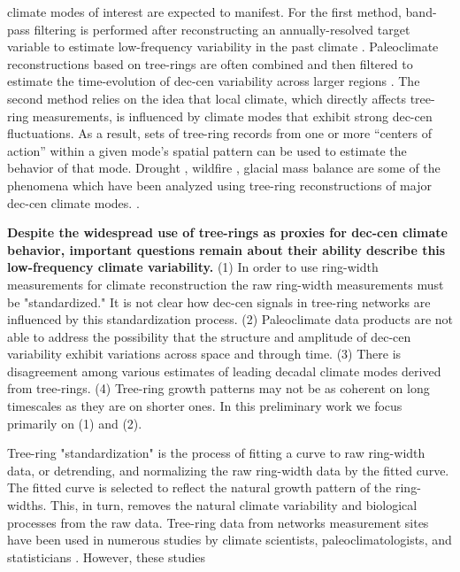 \documentclass[phd,tocprelim]{cornell}
\begin{document}
climate modes of interest are expected to manifest. For the 
first method, band-pass filtering is performed after reconstructing 
an annually-resolved target variable to estimate low-frequency 
variability in the past climate \cite{cook2004climate,meko2007medieval}. 
Paleoclimate reconstructions based on tree-rings are often combined 
and then filtered to estimate the time-evolution of dec-cen 
variability across larger regions \cite{d2005variability}. The 
second method relies on the idea that local climate, which directly 
affects tree-ring measurements, is influenced by climate modes that 
exhibit strong dec-cen fluctuations. As a result, sets of tree-ring 
records from one or more “centers of action” within a given mode’s 
spatial pattern can be used to estimate the behavior of that mode. 
Drought \cite{steinman2013isotopic}, wildfire \cite{hessl2004drought}, 
glacial mass balance \cite{larocque2005little} are some of the 
phenomena which have been analyzed using tree-ring reconstructions of 
major dec-cen climate modes. \cite{d2005temperature,gedalof2001interdecadal}. 
\par
\textbf{Despite the widespread use of tree-rings as proxies 
for dec-cen climate behavior, important questions remain about 
their ability describe this low-frequency climate variability.} 
(1) In order to use ring-width measurements for climate 
reconstruction the raw ring-width measurements must be 
"standardized." It is not clear how dec-cen signals in tree-ring 
networks are influenced by this standardization process. 
(2) Paleoclimate data products are not able to address the 
possibility that the structure and amplitude of dec-cen variability 
exhibit variations across space and through time. (3) There is 
disagreement among various estimates of leading decadal climate 
modes derived from tree-rings. (4) Tree-ring growth patterns may not be 
as coherent on long timescales as they are on shorter ones. 
In this preliminary work we focus primarily on (1) and (2).  
\par
Tree-ring "standardization" is the process of fitting a curve to raw 
ring-width data, or detrending, and normalizing the raw ring-width 
data by the fitted curve. The fitted curve is selected to reflect the 
natural growth pattern of the ring-widths. This, in turn, removes 
the natural climate variability and biological processes from the 
raw data. Tree-ring data from networks measurement sites have been 
used in numerous studies by climate scientists, paleoclimatologists, 
and statisticians \cite{tingley2013recent}. However, these studies  
\end{document}
